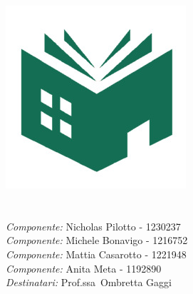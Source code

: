 \makeatletter
    \begin{titlepage}
        \begin{center}
            \includegraphics[width=0.4\linewidth]{images/icon.jpg}\\[10ex]
            {\huge \bfseries  \@title }\\[5ex]
            {\large \@date} \\[10ex]
            {\large \textit{Componente:} Nicholas Pilotto - 1230237} \\[2ex]
            {\large \textit{Componente:} Michele Bonavigo - 1216752} \\[2ex]
            {\large \textit{Componente:} Mattia Casarotto - 1221948} \\[2ex]
            {\large \textit{Componente:} Anita Meta - 1192890} \\[2ex]
            {\large \textit{Destinatari:} Prof.ssa\ Ombretta Gaggi} \\[2ex]
        \end{center}
    \end{titlepage}
\makeatother
\thispagestyle{empty}
\newpage